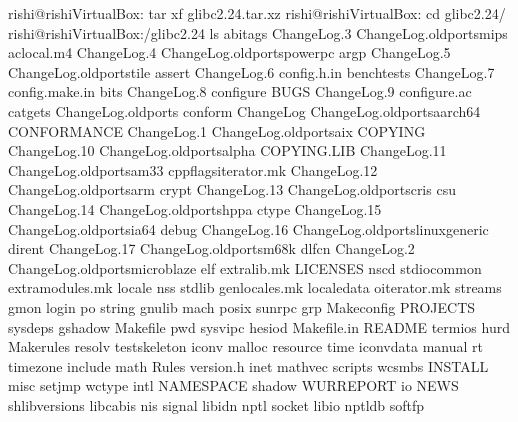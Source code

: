 \documentclass[letterpaper,10pt,english]{sphinxmanual}
\begin{document}
\begin{sphinxVerbatim}[commandchars=\\\{\}]
rishi@rishi\PYGZhy{}VirtualBox:\PYGZti{}\PYGZdl{} tar \PYGZhy{}xf glibc\PYGZhy{}2.24.tar.xz
rishi@rishi\PYGZhy{}VirtualBox:\PYGZti{}\PYGZdl{} cd glibc\PYGZhy{}2.24/
rishi@rishi\PYGZhy{}VirtualBox:\PYGZti{}/glibc\PYGZhy{}2.24\PYGZdl{} ls
abi\PYGZhy{}tags      ChangeLog.3                        ChangeLog.old\PYGZhy{}ports\PYGZhy{}mips
aclocal.m4    ChangeLog.4                        ChangeLog.old\PYGZhy{}ports\PYGZhy{}powerpc
argp          ChangeLog.5                        ChangeLog.old\PYGZhy{}ports\PYGZhy{}tile
assert        ChangeLog.6                        config.h.in
benchtests    ChangeLog.7                        config.make.in
bits          ChangeLog.8                        configure
BUGS          ChangeLog.9                        configure.ac
catgets       ChangeLog.old\PYGZhy{}ports                conform
ChangeLog     ChangeLog.old\PYGZhy{}ports\PYGZhy{}aarch64        CONFORMANCE
ChangeLog.1   ChangeLog.old\PYGZhy{}ports\PYGZhy{}aix            COPYING
ChangeLog.10  ChangeLog.old\PYGZhy{}ports\PYGZhy{}alpha          COPYING.LIB
ChangeLog.11  ChangeLog.old\PYGZhy{}ports\PYGZhy{}am33           cppflags\PYGZhy{}iterator.mk
ChangeLog.12  ChangeLog.old\PYGZhy{}ports\PYGZhy{}arm            crypt
ChangeLog.13  ChangeLog.old\PYGZhy{}ports\PYGZhy{}cris           csu
ChangeLog.14  ChangeLog.old\PYGZhy{}ports\PYGZhy{}hppa           ctype
ChangeLog.15  ChangeLog.old\PYGZhy{}ports\PYGZhy{}ia64           debug
ChangeLog.16  ChangeLog.old\PYGZhy{}ports\PYGZhy{}linux\PYGZhy{}generic  dirent
ChangeLog.17  ChangeLog.old\PYGZhy{}ports\PYGZhy{}m68k           dlfcn
ChangeLog.2   ChangeLog.old\PYGZhy{}ports\PYGZhy{}microblaze     elf
extra\PYGZhy{}lib.mk      LICENSES     nscd            stdio\PYGZhy{}common
extra\PYGZhy{}modules.mk  locale       nss             stdlib
gen\PYGZhy{}locales.mk    localedata   o\PYGZhy{}iterator.mk   streams
gmon              login        po              string
gnulib            mach         posix           sunrpc
grp               Makeconfig   PROJECTS        sysdeps
gshadow           Makefile     pwd             sysvipc
hesiod            Makefile.in  README          termios
hurd              Makerules    resolv          test\PYGZhy{}skeleton
iconv             malloc       resource        time
iconvdata         manual       rt              timezone
include           math         Rules           version.h
inet              mathvec      scripts         wcsmbs
INSTALL           misc         setjmp          wctype
intl              NAMESPACE    shadow          WUR\PYGZhy{}REPORT
io                NEWS         shlib\PYGZhy{}versions
libc\PYGZhy{}abis         nis          signal
libidn            nptl         socket
libio             nptl\PYGZus{}db      soft\PYGZhy{}fp
\end{sphinxVerbatim}
\end{document}
